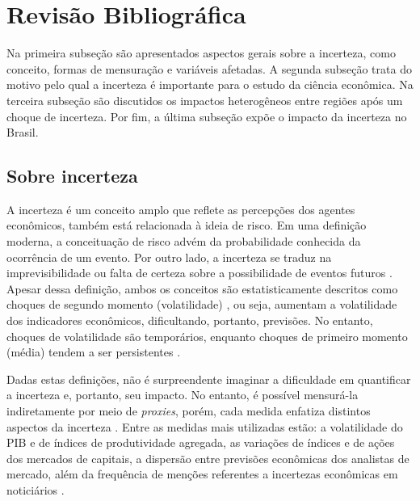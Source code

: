 \newpage
\section{Revisão Bibliográfica}

Na primeira subseção são apresentados aspectos gerais sobre a incerteza, como conceito, formas de mensuração e variáveis afetadas. A segunda subseção trata do motivo pelo qual a incerteza é importante para o estudo da ciência econômica. Na terceira subseção são discutidos os impactos heterogêneos entre regiões após um choque de incerteza. Por fim, a última subseção expõe o impacto da incerteza no Brasil.

\subsection{Sobre incerteza}

A incerteza é um conceito amplo que reflete as percepções dos agentes econômicos, também está relacionada à ideia de risco. Em uma definição moderna, a conceituação de risco advém da probabilidade conhecida da ocorrência de um evento. Por outro lado, a incerteza se traduz na imprevisibilidade ou falta de certeza sobre a possibilidade de eventos futuros \cite{knight1921risk}. Apesar dessa definição, ambos os conceitos são estatisticamente descritos como choques de segundo momento (volatilidade) \cite{haddow2013macroeconomic}, ou seja, aumentam a volatilidade dos indicadores econômicos, dificultando, portanto, previsões. No entanto, choques de volatilidade são temporários, enquanto choques de primeiro momento (média) tendem a ser persistentes \cite{bloom2009impact}. 
\par

Dadas estas definições, não é surpreendente imaginar a dificuldade em quantificar a incerteza e, portanto, seu impacto. No entanto, é possível mensurá-la indiretamente por meio de \textit{proxies}, porém, cada medida enfatiza distintos aspectos da incerteza \cite{FMI2012outlook}. Entre as medidas mais utilizadas estão: a volatilidade do \Gls{PIB} e de índices de produtividade agregada, as variações de índices e de ações dos mercados de capitais, a dispersão entre previsões econômicas dos analistas de mercado, além da frequência de menções referentes a incertezas econômicas em noticiários \cite{bloom2014fluctuations}.
\par
 
